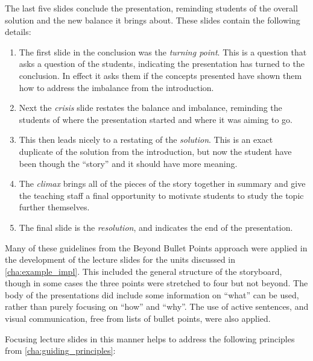 The last five slides conclude the presentation, reminding students of the overall solution and the new balance it brings about. These slides contain the following details:
\begin{enumerate}
	\item The first slide in the conclusion was the \emph{turning point}. This is a question that asks a question of the students, indicating the presentation has turned to the conclusion. In effect it asks them if the concepts presented have shown them how to address the imbalance from the introduction.
	\item Next the \emph{crisis} slide restates the balance and imbalance, reminding the students of where the presentation started and where it was aiming to go.
	\item This then leads nicely to a restating of the \emph{solution}. This is an exact duplicate of the solution from the introduction, but now the student have been though the ``story'' and it should have more meaning.
	\item The \emph{climax} brings all of the pieces of the story together in summary and give the teaching staff a final opportunity to motivate students to study the topic further themselves.
	\item The final slide is the \emph{resolution}, and indicates the end of the presentation.
\end{enumerate}

Many of these guidelines from the Beyond Bullet Points approach were applied in the development of the lecture slides for the units discussed in \cref{cha:example_impl}. This included the general structure of the storyboard, though in some cases the three points were stretched to four but not beyond. The body of the presentations did include some information on ``what'' can be used, rather than purely focusing on ``how'' and ``why''. The use of active sentences, and visual communication, free from lists of bullet points, were also applied.

Focusing lecture slides in this manner helps to address the following principles from \cref{cha:guiding_principles}:

